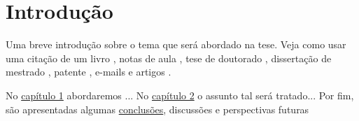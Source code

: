 \chapter*{Introdução}

Uma breve introdução sobre o tema que será abordado na tese. Veja como
usar uma citação de um livro \cite{Butkov_book}, notas de aula
\cite{Rosas}, tese de doutorado \cite{simeao_phdthesis}, dissertação de
mestrado \cite{oliveira_mastersthesis}, patente \cite{fernandes_pat},
e-mails \cite{manuel} e artigos \cite{B1, B2, A1, A2, A3}.

No \hyperlink{cap1}{capítulo 1} abordaremos ... No
\hyperlink{cap2}{capítulo 2} o assunto tal será tratado... Por fim, são
apresentadas algumas \hyperlink{conc}{conclusões}, discussões e
perspectivas futuras
